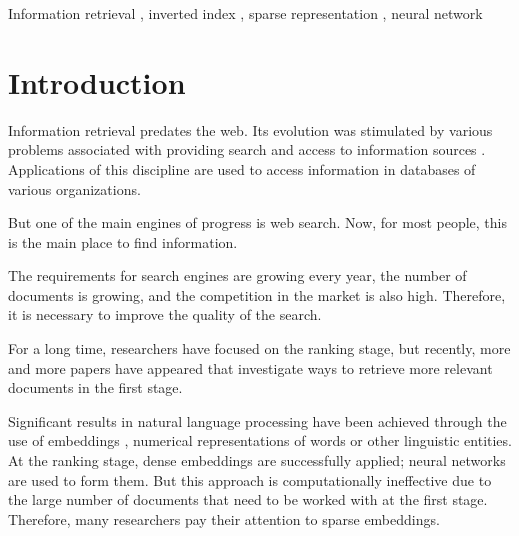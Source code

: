 \documentclass[
    twocolumn,
]{ceurart}
\begin{document}
    \begin{keywords}
        Information retrieval \sep
        inverted index \sep
        sparse representation \sep
        neural network
    \end{keywords}

    \maketitle


    \section{Introduction}

    Information retrieval predates the web.
    Its evolution was stimulated by various problems associated with providing search and access
    to information sources \cite{manning2008introduction}.
    Applications of this discipline are used to access information in databases of various
    organizations.

    But one of the main engines of progress is web search.
    Now, for most people, this is the main place to find information.

    The requirements for search engines are growing every year, the number of documents is growing,
    and the competition in the market is also high.
    Therefore, it is necessary to improve the quality of the search.

    For a long time, researchers have focused on the ranking stage, but recently, more and more
    papers have appeared that investigate ways to retrieve more relevant documents
    in the first stage.

    Significant results in natural language processing have been achieved through
    the use of embeddings \cite{embedding1, embedding2, embedding3}, numerical representations of
    words or other linguistic entities.
    At the ranking stage, dense embeddings are successfully applied;
    neural networks are used to form them.
    But this approach is computationally ineffective due to the large number of documents that
    need to be worked with at the first stage.
    Therefore, many researchers pay their attention to sparse embeddings.
\end{document}
